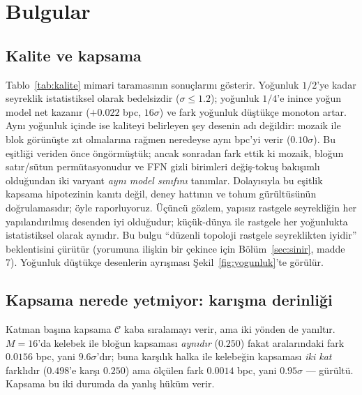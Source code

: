 \documentclass[10pt,journal]{IEEEtran}
\begin{document}
\section{Bulgular}
\subsection{Kalite ve kapsama}
Tablo~\ref{tab:kalite} mimari taramasının sonuçlarını gösterir. Yoğunluk $1/2$'ye kadar
seyreklik istatistiksel olarak bedelsizdir ($\sigma \le 1.2$); yoğunluk $1/4$'e inince yoğun
model net kazanır ($+0.022$ bpc, $16\sigma$) ve fark yoğunluk düştükçe monoton artar. Aynı
yoğunluk içinde ise kaliteyi belirleyen şey desenin adı değildir: mozaik ile blok görünüşte
zıt olmalarına rağmen neredeyse aynı bpc'yi verir ($0.10\sigma$). Bu eşitliği veriden önce
öngörmüştük; ancak sonradan fark ettik ki mozaik, bloğun satır/sütun permütasyonudur ve
FFN gizli birimleri değiş-tokuş bakışımlı olduğundan iki varyant \emph{aynı model sınıfını}
tanımlar. Dolayısıyla bu eşitlik kapsama hipotezinin kanıtı değil, deney hattının ve tohum
gürültüsünün doğrulamasıdır; öyle raporluyoruz. Üçüncü gözlem, yapısız rastgele seyrekliğin
her yapılandırılmış desenden iyi olduğudur; küçük-dünya ile rastgele her yoğunlukta
istatistiksel olarak aynıdır. Bu bulgu ``düzenli topoloji rastgele seyreklikten iyidir''
beklentisini çürütür (yorumuna ilişkin bir çekince için Bölüm~\ref{sec:sinir}, madde 7).
Yoğunluk düştükçe desenlerin ayrışması Şekil~\ref{fig:yogunluk}'te görülür.

\subsection{Kapsama nerede yetmiyor: karışma derinliği}
\label{sec:bulgu-tau}
Katman başına kapsama $\mathcal{C}$ kaba sıralamayı verir, ama iki yönden de yanıltır.
$M{=}16$'da kelebek ile bloğun kapsaması \emph{aynıdır} ($0.250$) fakat aralarındaki fark
$0.0156$ bpc, yani $9.6\sigma$'dır; buna karşılık halka ile kelebeğin kapsaması \emph{iki
kat} farklıdır ($0.498$'e karşı $0.250$) ama ölçülen fark $0.0014$ bpc, yani $0.95\sigma$ ---
gürültü. Kapsama bu iki durumda da yanlış hüküm verir.
\end{document}
